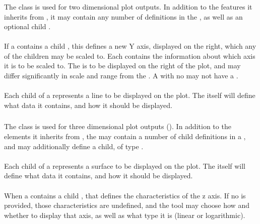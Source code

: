 \begin{blockChanged}
\subsubsection{}
\label{class:plot2D}
\label{class:listOfCurves}
The \PlotTwo class is used for two dimensional plot outputs. In addition to the features it inherits from \Plot, it may contain any number of \Curve definitions in the , as well as an optional child .

\paragraph*{}
If a \PlotTwo contains a child , this defines a new Y axis, displayed on the right, which any of the \Curve children may be scaled to.  Each \Curve contains the information about which axis it is to be scaled to.  The  is to be displayed on the right of the plot, and may differ significantly in scale and range from the .  A \PlotTwo with no  may not have a .

\paragraph*{}
Each child \AbstractCurve of a \PlotTwo represents a line to be displayed on the plot.  The \AbstractCurve itself will define what data it contains, and how it should be displayed.


\subsubsection{}
\label{class:plot3D}
\label{class:listOfSurfaces}
The \PlotThree class is used for three dimensional plot outputs (). In addition to the elements it inherits from \Plot, the \PlotThree may contain a number of child \Surface definitions in a , and may additionally define a  child, of type \Axis.

\paragraph*{}
Each child \Surface of a \PlotThree represents a surface to be displayed on the plot.  The \Surface itself will define what data it contains, and how it should be displayed.

\paragraph*{}
When a \PlotThree contains a child , that \Axis defines the characteristics of the z axis. If no  is provided, those characteristics are undefined, and the tool may choose how and whether to display that axis, as well as what type it is (linear or logarithmic).
\end{blockChanged}


